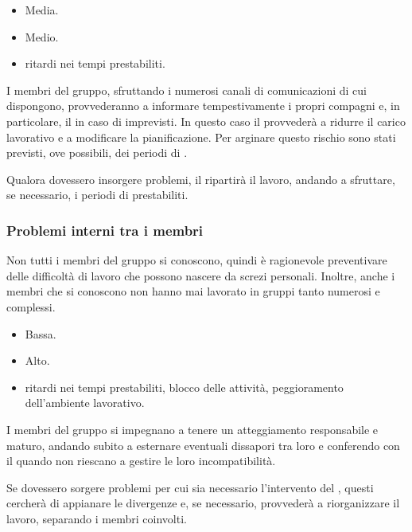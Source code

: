 \documentclass[a4paper, titlepage]{article}
\begin{document}
	\begin{itemize}
		\item {} Media.
		\item {} Medio.
		\item {} ritardi nei tempi prestabiliti.
	\end{itemize}
	
	I membri del gruppo, sfruttando i numerosi canali di comunicazioni di cui dispongono, provvederanno a informare tempestivamente i propri compagni e, in particolare, il  in caso di imprevisti. In questo caso il  provvederà a ridurre il carico lavorativo e a modificare la pianificazione. Per arginare questo rischio sono stati previsti, ove possibili, dei periodi di .
	
	Qualora dovessero insorgere problemi, il  ripartirà il lavoro, andando a sfruttare, se necessario, i periodi di  prestabiliti. 
	
	\subsubsection{Problemi interni tra i membri}
	Non tutti i membri del gruppo si conoscono, quindi è ragionevole preventivare delle difficoltà di lavoro che possono nascere da screzi personali. Inoltre, anche i membri che si conoscono non hanno mai lavorato in gruppi tanto numerosi e complessi.
	
	\begin{itemize}
		\item {} Bassa.
		\item {} Alto.
		\item {} ritardi nei tempi prestabiliti, blocco delle attività, peggioramento dell'ambiente lavorativo.
	\end{itemize}
	
	I membri del gruppo si impegnano a tenere un atteggiamento responsabile e maturo, andando subito a esternare eventuali dissapori tra loro e conferendo con il  quando non riescano a gestire le loro incompatibilità.
	
	Se dovessero sorgere problemi per cui sia necessario l'intervento del , questi cercherà di appianare le divergenze e, se necessario, provvederà a riorganizzare il lavoro, separando i membri coinvolti.
	
\end{document}
